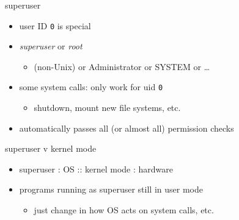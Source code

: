 \begin{frame}{superuser}
\begin{itemize}
\item user ID \texttt{0} is special
\item \textit{superuser} or \textit{root}
    \begin{itemize}
    \item (non-Unix) or Administrator or SYSTEM or \ldots
    \end{itemize}
\vspace{.5cm}
\item some system calls: only work for uid \texttt{0}
    \begin{itemize}
    \item shutdown, mount new file systems, etc.
    \end{itemize}
\item automatically passes all (or almost all) permission checks
\end{itemize}
\end{frame}

\begin{frame}{superuser v kernel mode}
    \begin{itemize}
    \item superuser : OS :: kernel mode : hardware
    \vspace{.5cm}
    \item programs running as superuser still in user mode
        \begin{itemize}
        \item just change in how OS acts on system calls, etc.
        \end{itemize}
    \end{itemize}
\end{frame}
